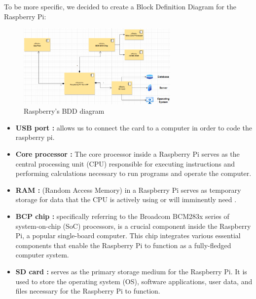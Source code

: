\documentclass[11pt]{article}
\begin{document}
	To be more specific, we decided to create a Block Definition Diagram for the Raspberry Pi:
	\begin{figure}[h]
		\begin{center}
			\includegraphics[width=0.7\textwidth]{RPi.png}
		\end{center}
		\caption{Raspberry's BDD diagram}
	\end{figure}
	\begin{itemize}
		\item\textbf{ USB port :} allows us to connect the card to a computer in order to code the raspberry pi.
		\item 	\textbf{Core processor :} The core processor inside a Raspberry Pi serves as the central processing unit (CPU) responsible for executing instructions and performing calculations necessary to run programs and operate the computer.
		\item \textbf{RAM :}  (Random Access Memory) in a Raspberry Pi serves as temporary storage for data that the CPU is actively using or will imminently need .
		\item \textbf{BCP chip :} specifically referring to the Broadcom BCM283x series of system-on-chip (SoC) processors, is a crucial component inside the Raspberry Pi, a popular single-board computer. This chip integrates various essential components that enable the Raspberry Pi to function as a fully-fledged computer system.
		\item \textbf{SD card :}  serves as the primary storage medium for the Raspberry Pi. It is used to store the operating system (OS), software applications, user data, and files necessary for the Raspberry Pi to function.
	\end{itemize}
	
	
	
	
\end{document}
